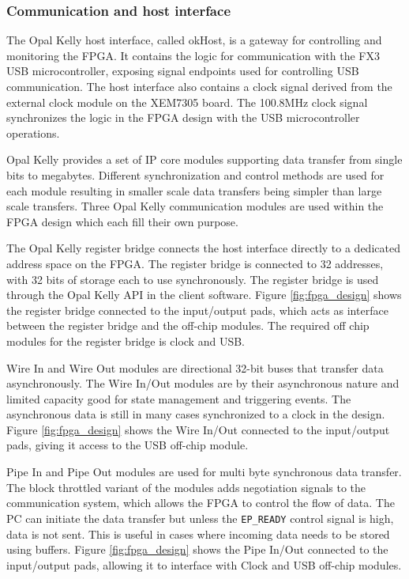 \documentclass[12pt]{report}
\begin{document}
\subsubsection{Communication and host interface}
The Opal Kelly host interface, called okHost, is a gateway for controlling and monitoring the FPGA. It contains the logic for communication with the FX3 USB microcontroller, exposing signal endpoints used for controlling USB communication. The host interface also contains a clock signal derived from the external clock module on the XEM7305 board. The 100.8MHz clock signal synchronizes the logic in the FPGA design with the USB microcontroller operations.
\par
Opal Kelly provides a set of IP core modules supporting data transfer from single bits to megabytes. Different synchronization and control methods are used for each module resulting in smaller scale data transfers being simpler than large scale transfers. Three Opal Kelly communication modules are used within the FPGA design which each fill their own purpose.
\par
The Opal Kelly register bridge connects the host interface directly to a dedicated address space on the FPGA. The register bridge is connected to 32 addresses, with 32 bits of storage each to use synchronously. The register bridge is used through the Opal Kelly API in the client software. Figure \ref*{fig:fpga_design} shows the register bridge connected to the input/output pads, which acts as interface between the register bridge and the off-chip modules. The required off chip modules for the register bridge is clock and USB. 
\par
Wire In and Wire Out modules are directional 32-bit buses that transfer data asynchronously. The Wire In/Out modules are by their asynchronous nature and limited capacity good for state management and triggering events. The asynchronous data is still in many cases synchronized to a clock in the design. Figure \ref*{fig:fpga_design} shows the Wire In/Out connected to the input/output pads, giving it access to the USB off-chip module.
\par
Pipe In and Pipe Out modules are used for multi byte synchronous data transfer. The block throttled variant of the modules adds negotiation signals to the communication system, which allows the FPGA to control the flow of data. The PC can initiate the data transfer but unless the \verb|EP_READY| control signal is high, data is not sent. This is useful in cases where incoming data needs to be stored using buffers.
Figure \ref*{fig:fpga_design} shows the Pipe In/Out connected to the input/output pads, allowing it to interface with Clock and USB off-chip modules.
\end{document}
